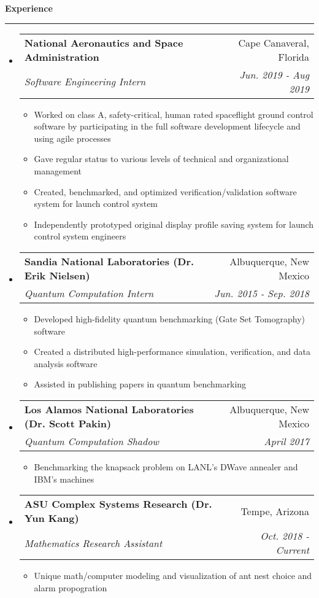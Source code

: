 \documentclass[letterpaper,11pt]{article}
\makeatletter
\newcommand{\sectionline}{
    \noindent\rule[0.5ex]{\linewidth}{0.5pt}
}
\newcommand{\resitem}[1]{\item #1 \vspace{-3pt}}
\newcommand{\resheading}[1]{
    {\large \textbf{#1}}
    \sectionline
}
\newcommand{\colfill}{@{\extracolsep{\fill}}}
\newcommand{\ressubheading}[4]{
\begin{tabular*}{6.5in}{l\colfill r}
		\textbf{#1} & #2 \\
		\textit{#3} & \textit{#4} \\
\end{tabular*}\vspace{-6pt}}
\makeatother
\begin{document}
\resheading{Experience}
\begin{itemize}
 \item
     \ressubheading{National Aeronautics and Space Administration}{Cape Canaveral, Florida}{Software Engineering Intern}{Jun. 2019 - Aug 2019}
 	\begin{itemize}
 		\resitem{Worked on class A, safety-critical, human rated spaceflight ground control software by participating in the full software development lifecycle and using agile processes}
 		\resitem{Gave regular status to various levels of technical and organizational management}
        \resitem{Created, benchmarked, and optimized verification/validation software system for launch control system}
 		\resitem{Independently prototyped original display profile saving system for launch control system engineers}
 	\end{itemize}
 \item
    \ressubheading{Sandia National Laboratories (Dr. Erik Nielsen)}{Albuquerque, New Mexico}{Quantum Computation Intern}{Jun. 2015 - Sep. 2018}
 	\begin{itemize}
        \resitem{Developed high-fidelity quantum benchmarking (Gate Set Tomography) software}
 		\resitem{Created a distributed high-performance simulation, verification, and data analysis software}
 		\resitem{Assisted in publishing papers in quantum benchmarking}
 	\end{itemize}
 \item
     \ressubheading{Los Alamos National Laboratories (Dr. Scott Pakin)}{Albuquerque, New Mexico}{Quantum Computation Shadow}{April 2017}
 	\begin{itemize}
 		\resitem{Benchmarking the knapsack problem on LANL's DWave annealer and IBM's machines}
 	\end{itemize}
 \item
    \ressubheading{ASU Complex Systems Research (Dr. Yun Kang)}{Tempe, Arizona}{Mathematics Research Assistant}{Oct. 2018 - Current}
 	\begin{itemize}
 		\resitem{Unique math/computer modeling and visualization of ant nest choice and alarm propogration}

\end{itemize}
\end{itemize}
\end{document}

